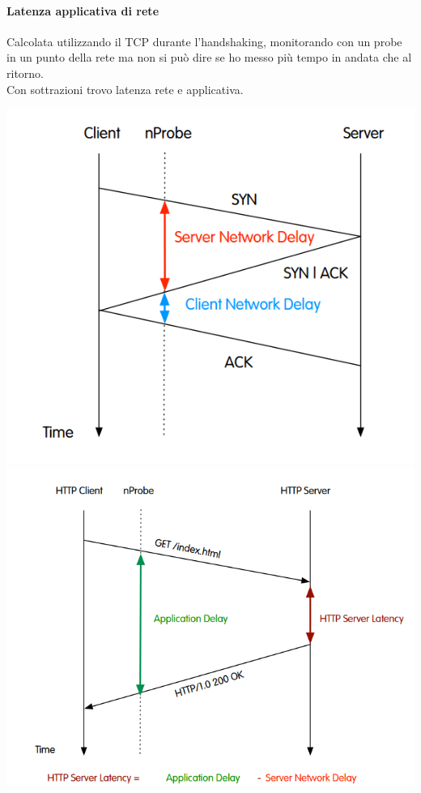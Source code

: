 \documentclass[10pt]{book}
\begin{document}
\paragraph{Latenza applicativa di rete} Calcolata utilizzando il TCP durante l'handshaking, monitorando con un probe in un punto della rete ma non si può dire se ho messo più tempo in andata che al ritorno.\\
Con sottrazioni trovo latenza rete e applicativa.
\begin{multicols}{2}
	\includegraphics[scale=0.5]{latency1.png}\\
	\includegraphics[scale=0.5]{latency2.png}
\end{multicols}
\end{document}
